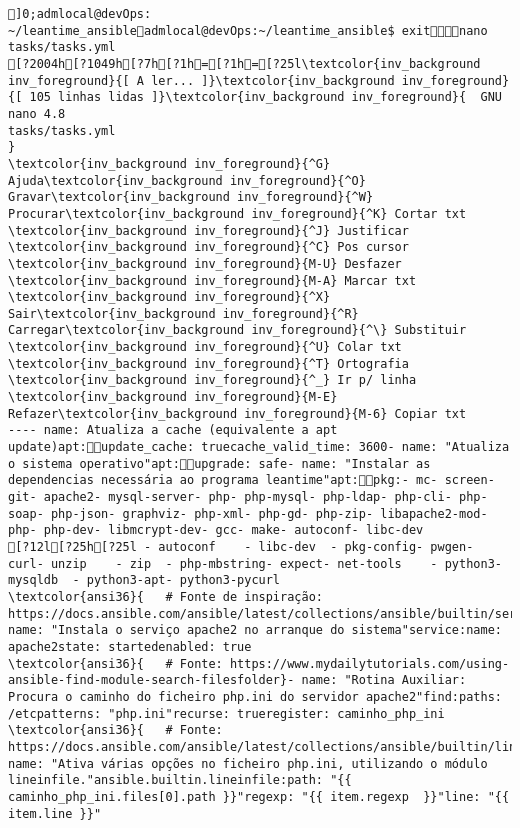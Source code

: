 \documentclass{scrartcl}
\title{}
\begin{document}
\begin{Verbatim}
]0;admlocal@devOps: ~/leantime_ansibleadmlocal@devOps:~/leantime_ansible$ exitnano tasks/tasks.yml 
[?2004h[?1049h[?7h[?1h=[?1h=[?25l\textcolor{inv_background inv_foreground}{[ A ler... ]}\textcolor{inv_background inv_foreground}{[ 105 linhas lidas ]}\textcolor{inv_background inv_foreground}{  GNU nano 4.8                                                tasks/tasks.yml                                                             }
\textcolor{inv_background inv_foreground}{^G} Ajuda\textcolor{inv_background inv_foreground}{^O} Gravar\textcolor{inv_background inv_foreground}{^W} Procurar\textcolor{inv_background inv_foreground}{^K} Cortar txt    \textcolor{inv_background inv_foreground}{^J} Justificar    \textcolor{inv_background inv_foreground}{^C} Pos cursor    \textcolor{inv_background inv_foreground}{M-U} Desfazer     \textcolor{inv_background inv_foreground}{M-A} Marcar txt
\textcolor{inv_background inv_foreground}{^X} Sair\textcolor{inv_background inv_foreground}{^R} Carregar\textcolor{inv_background inv_foreground}{^\} Substituir    \textcolor{inv_background inv_foreground}{^U} Colar txt     \textcolor{inv_background inv_foreground}{^T} Ortografia    \textcolor{inv_background inv_foreground}{^_} Ir p/ linha   \textcolor{inv_background inv_foreground}{M-E} Refazer\textcolor{inv_background inv_foreground}{M-6} Copiar txt
---- name: Atualiza a cache (equivalente a apt update)apt:update_cache: truecache_valid_time: 3600- name: "Atualiza o sistema operativo"apt:upgrade: safe- name: "Instalar as dependencias necessária ao programa leantime"apt:pkg:- mc- screen- git- apache2- mysql-server- php- php-mysql- php-ldap- php-cli- php-soap- php-json- graphviz- php-xml- php-gd- php-zip- libapache2-mod-php- php-dev- libmcrypt-dev- gcc- make- autoconf- libc-dev
[?12l[?25h[?25l - autoconf    - libc-dev  - pkg-config- pwgen- curl- unzip    - zip  - php-mbstring- expect- net-tools    - python3-mysqldb  - python3-apt- python3-pycurl
\textcolor{ansi36}{   # Fonte de inspiração: https://docs.ansible.com/ansible/latest/collections/ansible/builtin/service_module.html}- name: "Instala o serviço apache2 no arranque do sistema"service:name: apache2state: startedenabled: true
\textcolor{ansi36}{   # Fonte: https://www.mydailytutorials.com/using-ansible-find-module-search-filesfolder}- name: "Rotina Auxiliar: Procura o caminho do ficheiro php.ini do servidor apache2"find:paths: /etcpatterns: "php.ini"recurse: trueregister: caminho_php_ini
\textcolor{ansi36}{   # Fonte: https://docs.ansible.com/ansible/latest/collections/ansible/builtin/lineinfile_module.html}- name: "Ativa várias opções no ficheiro php.ini, utilizando o módulo lineinfile."ansible.builtin.lineinfile:path: "{{ caminho_php_ini.files[0].path }}"regexp: "{{ item.regexp  }}"line: "{{ item.line }}"

\end{Verbatim}
\end{document}
